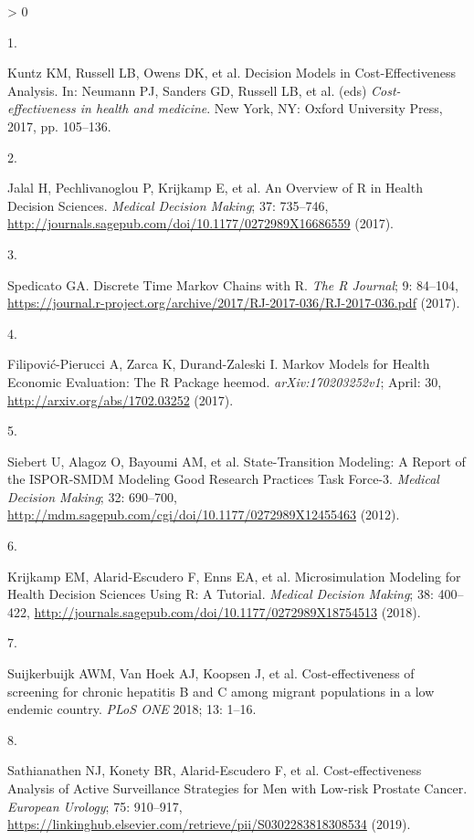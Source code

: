 \documentclass[
]{article}
\newlength{\cslhangindent}
\newlength{\csllabelwidth}
\newenvironment{CSLReferences}[2] %
 {%
  \setlength{\parindent}{0pt}
  \ifodd #1 \everypar{\setlength{\hangindent}{\cslhangindent}}\ignorespaces\fi
  \ifnum #2 > 0
  \setlength{\parskip}{#2\baselineskip}
  \fi
 }%
 {}
\newcommand{\CSLLeftMargin}[1]{\parbox[t]{\csllabelwidth}{#1}}
\newcommand{\CSLRightInline}[1]{\parbox[t]{\linewidth - \csllabelwidth}{#1}\break}
\begin{document}
\hypertarget{refs}{}
\begin{CSLReferences}{0}{0}
\leavevmode\hypertarget{ref-Kuntz2017}{}%
\CSLLeftMargin{1. }
\CSLRightInline{Kuntz KM, Russell LB, Owens DK, et al. {Decision Models in Cost-Effectiveness Analysis}. In: Neumann PJ, Sanders GD, Russell LB, et al. (eds) \emph{Cost-effectiveness in health and medicine}. New York, NY: Oxford University Press, 2017, pp. 105--136.}

\leavevmode\hypertarget{ref-Jalal2017b}{}%
\CSLLeftMargin{2. }
\CSLRightInline{Jalal H, Pechlivanoglou P, Krijkamp E, et al. {An Overview of R in Health Decision Sciences}. \emph{Medical Decision Making}; 37: 735--746, \url{http://journals.sagepub.com/doi/10.1177/0272989X16686559} (2017).}

\leavevmode\hypertarget{ref-Spedicato2017}{}%
\CSLLeftMargin{3. }
\CSLRightInline{Spedicato GA. {Discrete Time Markov Chains with R}. \emph{The R Journal}; 9: 84--104, \url{https://journal.r-project.org/archive/2017/RJ-2017-036/RJ-2017-036.pdf} (2017).}

\leavevmode\hypertarget{ref-Filipovic-Pierucci2017}{}%
\CSLLeftMargin{4. }
\CSLRightInline{Filipović-Pierucci A, Zarca K, Durand-Zaleski I. {Markov Models for Health Economic Evaluation: The R Package heemod}. \emph{arXiv:170203252v1}; April: 30, \url{http://arxiv.org/abs/1702.03252} (2017).}

\leavevmode\hypertarget{ref-Siebert2012c}{}%
\CSLLeftMargin{5. }
\CSLRightInline{Siebert U, Alagoz O, Bayoumi AM, et al. {State-Transition Modeling: A Report of the ISPOR-SMDM Modeling Good Research Practices Task Force-3}. \emph{Medical Decision Making}; 32: 690--700, \url{http://mdm.sagepub.com/cgi/doi/10.1177/0272989X12455463} (2012).}

\leavevmode\hypertarget{ref-Krijkamp2018}{}%
\CSLLeftMargin{6. }
\CSLRightInline{Krijkamp EM, Alarid-Escudero F, Enns EA, et al. {Microsimulation Modeling for Health Decision Sciences Using R: A Tutorial}. \emph{Medical Decision Making}; 38: 400--422, \url{http://journals.sagepub.com/doi/10.1177/0272989X18754513} (2018).}

\leavevmode\hypertarget{ref-Suijkerbuijk2018}{}%
\CSLLeftMargin{7. }
\CSLRightInline{Suijkerbuijk AWM, Van Hoek AJ, Koopsen J, et al. {Cost-effectiveness of screening for chronic hepatitis B and C among migrant populations in a low endemic country}. \emph{PLoS ONE} 2018; 13: 1--16.}

\leavevmode\hypertarget{ref-Sathianathen2018a}{}%
\CSLLeftMargin{8. }
\CSLRightInline{Sathianathen NJ, Konety BR, Alarid-Escudero F, et al. {Cost-effectiveness Analysis of Active Surveillance Strategies for Men with Low-risk Prostate Cancer}. \emph{European Urology}; 75: 910--917, \url{https://linkinghub.elsevier.com/retrieve/pii/S0302283818308534} (2019).}


\end{CSLReferences}
\end{document}
